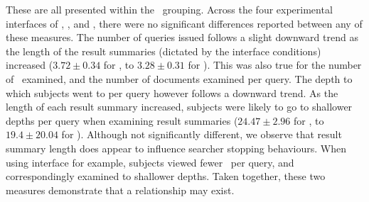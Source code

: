 These are all presented within the ~grouping. Across the four experimental interfaces of , ,  and , there were no significant differences reported between any of these measures. The number of queries issued follows a slight downward trend as the length of the result summaries (dictated by the interface conditions) increased ($3.72 \pm 0.34$ for , to $3.28\pm0.31$ for ). This was also true for the number of~ examined, and the number of documents examined per query. The depth to which subjects went to per query however follows a downward trend. As the length of each result summary increased, subjects were likely to go to shallower depths per query when examining result summaries ($24.47\pm2.96$ for , to $19.4\pm20.04$ for ). Although not significantly different, we observe that result summary length does appear to influence searcher stopping behaviours. When using interface  for example, subjects viewed fewer~ per query, and correspondingly examined to shallower depths. Taken together, these two measures demonstrate that a relationship may exist.

